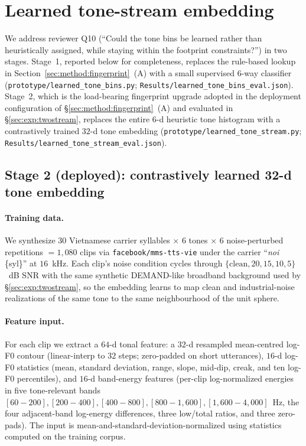 \documentclass[a4paper,fleqn]{cas-dc}
\begin{document}
\section{Learned tone-stream embedding}\label{app:learnedtone}

We address reviewer Q10 (``Could the tone bins be learned rather than heuristically assigned, while staying within the footprint constraints?'') in two stages. Stage~1, reported below for completeness, replaces the rule-based lookup in Section~\ref{sec:method:fingerprint}~(A) with a small supervised $6$-way classifier (\texttt{prototype/learned\_tone\_bins.py}; \texttt{Results/learned\_tone\_bins\_eval.json}). Stage~2, which is the load-bearing fingerprint upgrade adopted in the deployment configuration of \S\ref{sec:method:fingerprint}~(A) and evaluated in \S\ref{sec:exp:twostream}, replaces the entire $6$-d heuristic tone histogram with a contrastively trained $32$-d tone embedding (\texttt{prototype/learned\_tone\_stream.py}; \texttt{Results/learned\_tone\_stream\_eval.json}).

\subsection{Stage 2 (deployed): contrastively learned 32-d tone embedding}\label{app:learnedtone:stage2}

\paragraph{Training data.} We synthesize $30$ Vietnamese carrier syllables $\times$ $6$ tones $\times$ $6$ noise-perturbed repetitions $= 1{,}080$ clips via \texttt{facebook/mms-tts-vie} under the carrier ``\emph{noi} \{syl\}'' at $16$~kHz. Each clip's noise condition cycles through $\{\text{clean}, 20, 15, 10, 5\}$~dB SNR with the same synthetic DEMAND-like broadband background used by \S\ref{sec:exp:twostream}, so the embedding learns to map clean and industrial-noise realizations of the same tone to the same neighbourhood of the unit sphere.

\paragraph{Feature input.} For each clip we extract a $64$-d tonal feature: a $32$-d resampled mean-centred log-F0 contour (linear-interp to $32$ steps; zero-padded on short utterances), $16$-d log-F0 statistics (mean, standard deviation, range, slope, mid-dip, creak, and ten log-F0 percentiles), and $16$-d band-energy features (per-clip log-normalized energies in five tone-relevant bands $[60{-}200], [200{-}400], [400{-}800], [800{-}1{,}600], [1{,}600{-}4{,}000]$~Hz, the four adjacent-band log-energy differences, three low/total ratios, and three zero-pads). The input is mean-and-standard-deviation-normalized using statistics computed on the training corpus.
\end{document}
